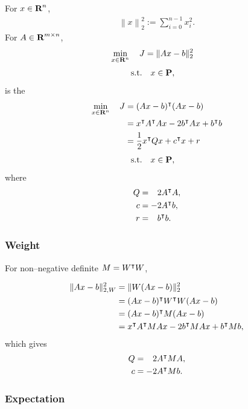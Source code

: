 \documentclass{article}
\begin{document}
    For $x\in\textbf{R}^n$, 
    \begin{align*}
            \left\| x \right\|_2^2 
        :=
            \sum_{i=0}^{n-1} x_i^2.
    \end{align*} 
    For $A\in\textbf{R}^{m\times n}$,
    \begin{align*}
            \min_{x\in\textbf{R}^n}
        \quad 
            J 
        &=  
            \|Ax-b\|_2^2
    \end{align*}
    \begin{align*}
        \text{s.t.}\quad &x\in\textbf{P},
    \end{align*}
    is the \QP
    \begin{align*}
        \min_{x\in\textbf{R}^n}\quad J 
    &=
        (Ax-b)^\intercal (Ax-b)              
    \\
    &=
            x^\intercal A^\intercal A x 
        -   2b^\intercal Ax 
        +   b^\intercal b\\
    &=\frac{1}{2}x^\intercal Q x +c^\intercal x + r
    \end{align*}
    \begin{align*} 
        \text{s.t.}\quad &x\in\textbf{P},
    \end{align*}
    where
    \begin{align*}
    Q &= \minus 2A^\tp A,\\
    c &= -2A^\tp b,\\
    r &= \minus b^\tp b. 
    \end{align*}

    \subsubsection{Weight}
    For non--negative definite $M=W^\intercal W$, 

    \begin{align*}
        \|Ax-b\|_{2,W}^2 
        &=\|W(Ax-b)\|_2^2\\
        &=(Ax-b)^\intercal W^\intercal W (Ax-b)\\
        &= (Ax-b)^\intercal M (Ax-b)\\
        &= x^\intercal A^\intercal M A x - 2 b^\intercal M A x + b^\intercal M b,
    \end{align*}
    which gives
    \begin{align*}
        Q&=\minus 2 A^\tp M A,\\
        c&=-2A^\tp M b.
    \end{align*}

    \subsubsection{Expectation}
\end{document}
